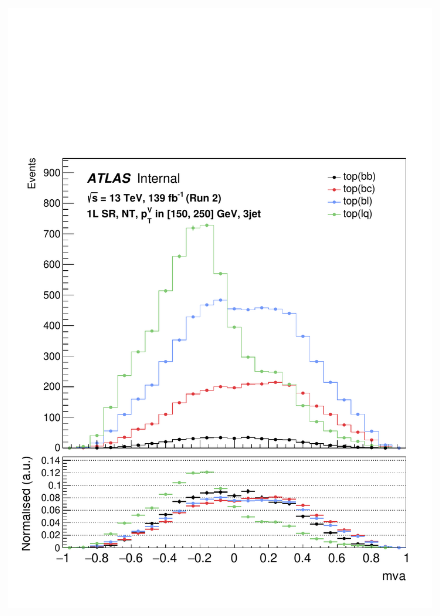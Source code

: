 \begin{figure}[h!]
\includegraphics[scale=0.253]{Images/VH/top/OneLepton_top_1nttag3jet_SR_150_250ptv_mva.pdf}

\end{figure}
